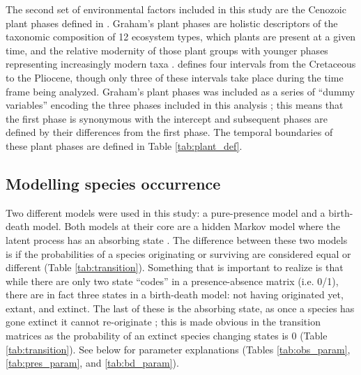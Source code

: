 \documentclass[12pt,letterpaper]{article}
\begin{document}
The second set of environmental factors included in this study are the Cenozoic plant phases defined in \citet{Graham2011a}. Graham's plant phases are holistic descriptors of the taxonomic composition of 12 ecosystem types, which plants are present at a given time, and the relative modernity of those plant groups with younger phases representing increasingly modern taxa \citep{Graham2011a}. \citet{Graham2011a} defines four intervals from the Cretaceous to the Pliocene, though only three of these intervals take place during the time frame being analyzed. Graham's plant phases was included as a series of ``dummy variables'' encoding the three phases included in this analysis \citep{Gelman2007}; this means that the first phase is synonymous with the intercept and subsequent phases are defined by their differences from the first phase. The temporal boundaries of these plant phases are defined in Table \ref{tab:plant_def}.


\subsection*{Modelling species occurrence}
Two different models were used in this study: a pure-presence model and a birth-death model. Both models at their core are a hidden Markov model where the latent process has an absorbing state \citep{Allen2011}. The difference between these two models is if the probabilities of a species originating or surviving are considered equal or different (Table \ref{tab:transition}). Something that is important to realize is that while there are only two state ``codes'' in a presence-absence matrix (i.e. 0/1), there are in fact three states in a birth-death model: not having originated yet, extant, and extinct. The last of these is the absorbing state, as once a species has gone extinct it cannot re-originate \citep{Allen2011}; this is made obvious in the transition matrices as the probability of an extinct species changing states is 0 (Table \ref{tab:transition}). See below for parameter explanations (Tables \ref{tab:obs_param}, \ref{tab:pres_param}, and \ref{tab:bd_param}).
\end{document}
